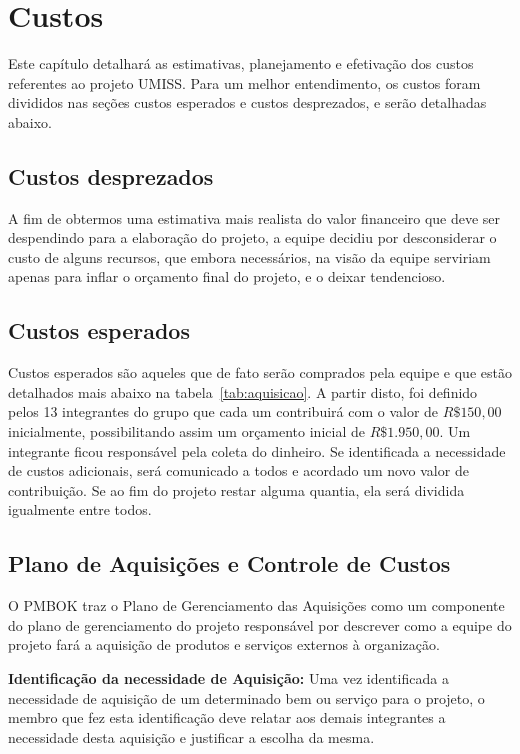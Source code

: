 \chapter{Custos}

Este capítulo detalhará as estimativas, planejamento e efetivação dos custos
referentes ao projeto UMISS. Para um melhor entendimento, os custos foram divididos
nas seções custos esperados e custos desprezados, e serão detalhadas abaixo.

\section{Custos desprezados}

A fim de obtermos uma estimativa mais realista do valor financeiro que deve ser
despendindo para a elaboração do projeto, a equipe decidiu por desconsiderar o custo
de alguns recursos, que embora necessários, na visão da equipe serviriam apenas
para inflar o orçamento final do projeto, e o deixar tendencioso. 

\section{Custos esperados}

Custos esperados são aqueles que de fato serão comprados pela equipe e que estão detalhados mais abaixo
na tabela~\ref{tab:aquisicao}. A partir disto, foi definido pelos 13 integrantes do grupo que cada
um contribuirá com o valor de $R\$ 150,00$ inicialmente, possibilitando assim um orçamento
inicial de $R\$ 1.950,00$. Um integrante ficou responsável pela coleta do dinheiro.
Se identificada a necessidade de custos adicionais, será comunicado a todos e acordado
um novo valor de contribuição. Se ao fim do projeto restar alguma quantia, ela
será dividida igualmente entre todos.

\section{Plano de Aquisições e Controle de Custos}

O PMBOK traz o Plano de Gerenciamento das Aquisições como um componente do plano
de gerenciamento do projeto responsável por descrever como a equipe do projeto
fará a aquisição de produtos e serviços externos à organização.

\textbf{Identificação da necessidade de Aquisição:} Uma vez identificada a necessidade
de aquisição de um determinado bem ou serviço para o projeto, o membro que fez esta
identificação deve relatar aos demais integrantes a necessidade desta aquisição e
justificar a escolha da mesma.

